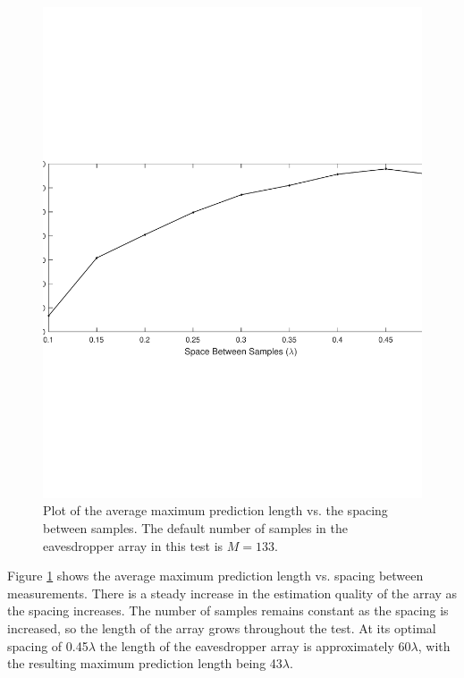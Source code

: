 \documentclass{allertonproc}
\begin{document}
\begin{figure}[tbp]
\begin{center}
\includegraphics[width=6in]{wavelengths}
\caption{Plot of the average maximum prediction length vs. the spacing between samples. The default number of samples in the eavesdropper array in this test is $M = 133$.}\label{spacing}
\end{center}
\end{figure}
Figure \ref{spacing} shows the average maximum prediction length vs. spacing between measurements. There is a steady increase in the estimation quality of the array as the spacing increases. The number of samples remains constant as the spacing is increased, so the length of the array grows throughout the test. At its optimal spacing of 0.45$\lambda$ the length of the eavesdropper array is approximately 60$\lambda$, with the resulting maximum prediction length being 43$\lambda$.
\end{document}
